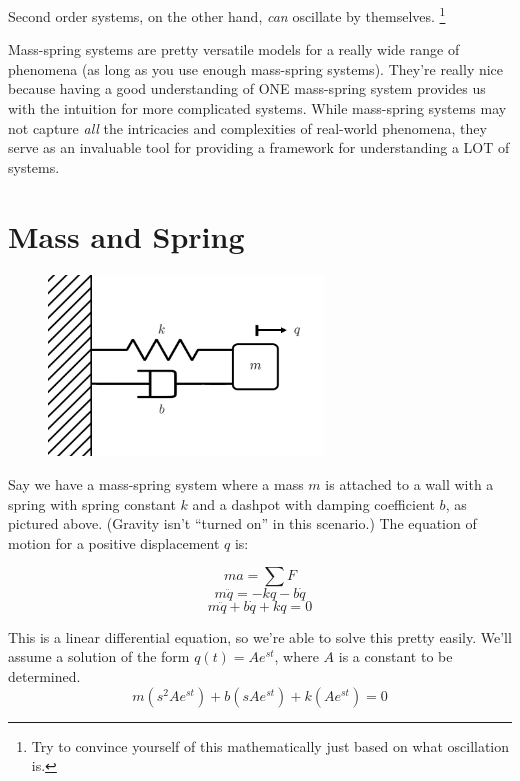 \documentclass[
  letterpaper,
  DIV=11,
  numbers=noendperiod]{scrreprt}
\begin{document}
Second order systems, on the other hand, \emph{can} oscillate by
themselves. \footnote{Try to convince yourself of this mathematically
  just based on what oscillation is.}

Mass-spring systems are pretty versatile models for a really wide range
of phenomena (as long as you use enough mass-spring systems). They're
really nice because having a good understanding of ONE mass-spring
system provides us with the intuition for more complicated systems.
While mass-spring systems may not capture \emph{all} the intricacies and
complexities of real-world phenomena, they serve as an invaluable tool
for providing a framework for understanding a LOT of systems.

\hypertarget{mass-and-spring}{%
\section{Mass and Spring}\label{mass-and-spring}}

\begin{figure}

{\centering \includegraphics[width=0.65\textwidth,height=\textheight]{figs/3_msd.png}

}

\end{figure}

Say we have a mass-spring system where a mass \(m\) is attached to a
wall with a spring with spring constant \(k\) and a dashpot with damping
coefficient \(b\), as pictured above. (Gravity isn't ``turned on'' in
this scenario.) The equation of motion for a positive displacement \(q\)
is:

\[ ma = \sum F \] \[m\ddot{q} = -kq - b\dot{q}\]
\[m\ddot{q} + b\dot{q} + kq = 0\]

This is a linear differential equation, so we're able to solve this
pretty easily. We'll assume a solution of the form \(q(t) = Ae^{st}\),
where \(A\) is a constant to be determined.
\[m \left( s^2 Ae^{st} \right) + b \left( sAe^{st} \right)+ k \left(Ae^{st} \right)= 0\]
\end{document}
